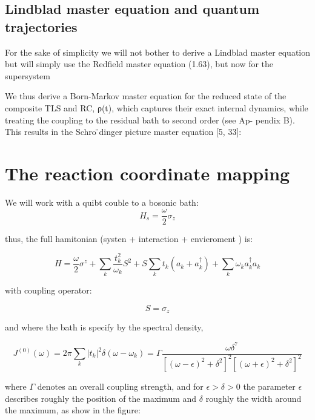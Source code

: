 \documentclass[%
preprint,
onecolumn,
notitlepag,
 amsmath,amssymb,
 aps,
 pra,
]{revtex4-2}
\begin{document}
\subsection{Lindblad master equation and quantum trajectories}

For the sake of simplicity we will not bother to derive a Lindblad master equation but will simply use the Redfield master equation (1.63), but now for the supersystem

We thus derive a Born-Markov master equation for the reduced state of the composite TLS and RC, ρ(t), which captures their exact internal dynamics, while treating the coupling to the residual bath to second order (see Ap- pendix B). This results in the Schro ̈dinger picture master equation [5, 33]:


\appendix
\section{The reaction coordinate mapping}
\label{A:RCmap}
We will work with a quibt couble to a bosonic bath:
\begin{equation}
 H_s= \frac{\omega}{2} \sigma_z    
\end{equation}
 
 thus, the full hamitonian (systen + interaction + envieroment ) is:



\begin{equation}
H=\frac{\omega}{2} \sigma^{z}+\sum_{k} \frac{t_{k}^{2}}{\omega_{k}} S^{2}+S \sum_{k} t_{k}\left(a_{k}+a_{k}^{\dagger}\right)+\sum_{k} \omega_{k} a_{k}^{\dagger} a_{k}
\end{equation}


with coupling operator:

\begin{equation}
    S=\sigma_z
\end{equation}

and where the bath is specify by the spectral density, 

\begin{equation}
J^{(0)}(\omega)=2 \pi \sum_{k}\left|t_{k}\right|^{2} \delta\left(\omega-\omega_{k}\right)=\Gamma \frac{\omega \delta^{7}}{\left[(\omega-\epsilon)^{2}+\delta^{2}\right]^{2}\left[(\omega+\epsilon)^{2}+\delta^{2}\right]^{2}}
\end{equation}

where $\Gamma$ denotes an overall coupling strength, and for $\epsilon>\delta>0$ the parameter $\epsilon$ describes roughly the position of the maximum and $\delta$ roughly the width around the maximum, as show in the figure: 
\end{document}
